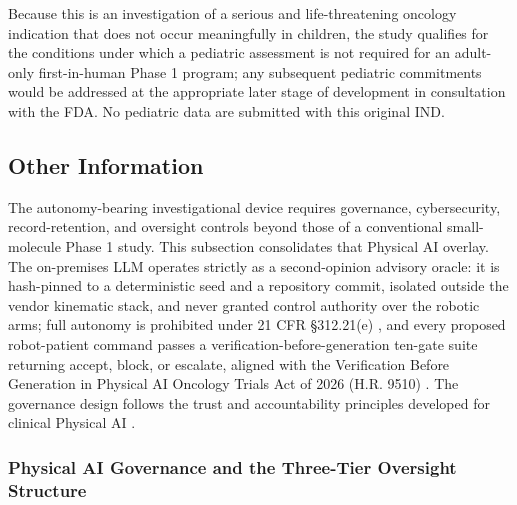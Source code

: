 Because this is an investigation of a serious and life-threatening oncology
indication that does not occur meaningfully in children, the study qualifies for
the conditions under which a pediatric assessment is not required for an adult-only
first-in-human Phase 1 program; any subsequent pediatric commitments would be
addressed at the appropriate later stage of development in consultation with the
FDA. No pediatric data are submitted with this original IND.

\subsection{Other Information}

The autonomy-bearing investigational device requires governance, cybersecurity,
record-retention, and oversight controls beyond those of a conventional small-molecule
Phase 1 study. This subsection consolidates that Physical AI overlay. The
on-premises LLM operates strictly as a second-opinion advisory oracle: it is
hash-pinned to a deterministic seed and a repository commit, isolated outside the
vendor kinematic stack, and never granted control authority over the robotic arms;
full autonomy is prohibited under 21 CFR \S 312.21(e) \cite{cfr312paiuni}, and every
proposed robot-patient command passes a verification-before-generation ten-gate
suite returning accept, block, or escalate, aligned with the Verification Before
Generation in Physical AI Oncology Trials Act of 2026 (H.R. 9510)
\cite{congress9510}. The governance design follows the trust and accountability
principles developed for clinical Physical AI \cite{clintrustpai,paiautospons}.

\subsubsection{Physical AI Governance and the Three-Tier Oversight Structure}


